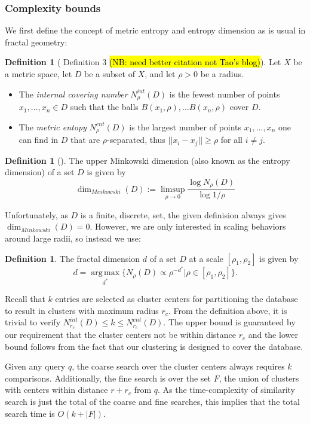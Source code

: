 \documentclass[review,preprint,12pt]{elsarticle}
\renewcommand{\cite}{\citep} %
\theoremstyle{definition}
\newtheorem{definition}[theorem]{Definition}
\theoremstyle{remark}
\numberwithin{equation}{section}
\begin{document}
\subsubsection{Complexity bounds}
We first define the concept of metric entropy and entropy dimension as is usual in fractal geometry:
\begin{definition}[\cite{tao2014metric} Definition 3 \hl{(NB: need better citation not Tao's blog)}]
    Let $X$ be a metric space, let $D$ be a subset of $X$, and let $\rho>0$ be a radius.
    \begin{itemize}
        \item The \textit{internal covering number} $N_\rho^{int}(D)$ is the fewest number of points $x_1, \ldots, x_n \in D$ such that the balls $B(x_1,\rho), \ldots B(x_n,\rho)$ cover $D$.
        \item The \textit{metric entopy} $N_\rho^{ent}(D)$ is the largest number of points $x_1, \ldots, x_n$ one can find in $D$ that are $\rho$-separated, thus $||x_i - x_j|| \ge \rho$ for all $i \ne j$.
    \end{itemize}
\end{definition}
\begin{definition}[\cite{falconer2013fractal}]
    The upper Minkowski dimension (also known as the entropy dimension) of a set $D$ is given by 
\[
    \dim_{Minkowski}(D) := \limsup_{\rho \to 0} \frac{\log N_\rho(D)}{\log 1/\rho}
\]
\end{definition}
Unfortunately, as $D$ is a finite, discrete, set, the given definision always gives $\dim_{Minkowski}(D) = 0$.
However, we are only interested in scaling behaviors around large radii, so instead we use:
\begin{definition}
    The fractal dimension $d$ of a set $D$ at a scale $[\rho_1,\rho_2]$ is given by
    \[
        d = \operatorname*{arg\,max}_{d^*} \{ N_\rho(D) \propto \rho^{-d^*} | \rho \in [\rho_1,\rho_2] \}.
    \]
\end{definition}

Recall that $k$ entries are selected as cluster centers for partitioning the database to result in clusters with maximum radius $r_c$.
From the definition above, it is trivial to verify $ N_{r_c}^{int}(D) \le k \le N_{r_c}^{ent} (D)$.
The upper bound is guaranteed by our requirement that the cluster centers not be within distance $r_c$ and the lower bound follows from the fact that our clustering is designed to cover the database.

Given any query $q$, the coarse search over the cluster centers always requires $k$ comparisons.
Additionally, the fine search is over the set $F$, the union of clusters with centers within distance $r+r_c$ from $q$.
As the time-complexity of similarity search is just the total of the coarse and fine searches, this implies that the total search time is $O(k + |F|)$.
\end{document}
